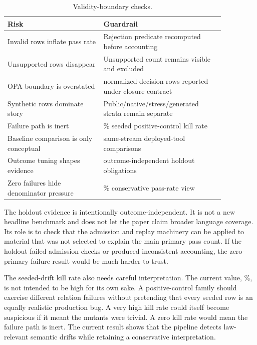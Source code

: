\documentclass[10pt,conference]{IEEEtran}
\begin{document}
\begin{table}[t]
\centering
\caption{Validity-boundary checks.}
\label{tab:validityboundary}
\begin{tabular}{p{0.38\linewidth}p{0.48\linewidth}}
\toprule
Risk & Guardrail \\
\midrule
Invalid rows inflate pass rate & Rejection predicate recomputed before accounting \\
Unsupported rows disappear & Unsupported count remains visible and excluded \\
OPA boundary is overstated & \LGOPANormalizedRows{} normalized-decision rows reported under closure contract \\
Synthetic rows dominate story & Public/native/stress/generated strata remain separate \\
Failure path is inert & \LGSeededKillRate{}\% seeded positive-control kill rate \\
Baseline comparison is only conceptual & \LGDeployedHeadToHeadRows{} same-stream deployed-tool comparisons \\
Outcome tuning shapes evidence & \LGHoldoutObligations{} outcome-independent holdout obligations \\
Zero failures hide denominator pressure & \LGAllCandidatePassRate{}\% conservative pass-rate view \\
\bottomrule
\end{tabular}
\end{table}

The holdout evidence is intentionally outcome-independent.  It is not a new headline benchmark and does not let the paper claim broader language coverage.  Its role is to check that the admission and replay machinery can be applied to material that was not selected to explain the main primary pass count.  If the holdout failed admission checks or produced inconsistent accounting, the zero-primary-failure result would be much harder to trust.

The seeded-drift kill rate also needs careful interpretation.  The current value, \LGSeededKillRate{}\%, is not intended to be high for its own sake.  A positive-control family should exercise different relation failures without pretending that every seeded row is an equally realistic production bug.  A very high kill rate could itself become suspicious if it meant the mutants were trivial.  A zero kill rate would mean the failure path is inert.  The current result shows that the pipeline detects law-relevant semantic drifts while retaining a conservative interpretation.
\end{document}
